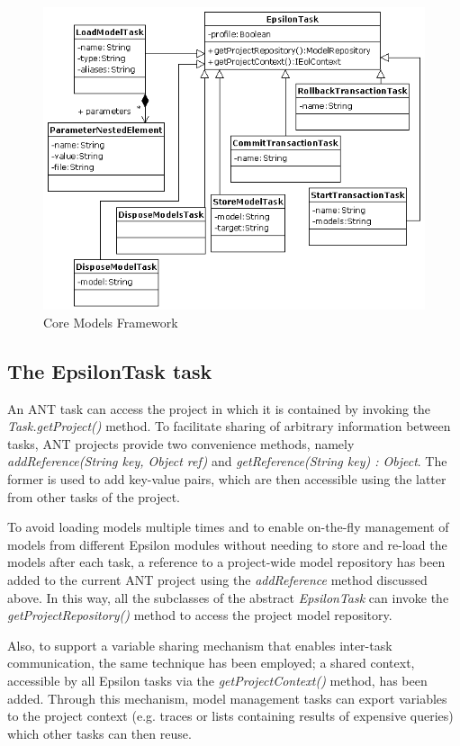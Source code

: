 \begin{figure}
	\centering
		\includegraphics{images/AntEpsilonModels.png}
	\caption{Core Models Framework}
	\label{fig:CoreModels}
\end{figure}

\subsection{The EpsilonTask task}
An ANT task can access the project in which it is contained by invoking the \emph{Task.getProject()} method. To facilitate sharing of arbitrary information between tasks, ANT projects provide two convenience methods, namely \emph{addReference(String key, Object ref)} and \emph{getReference(String key) : Object}. The former is used to add key-value pairs, which are then accessible using the latter from other tasks of the project.

To avoid loading models multiple times and to enable on-the-fly management of models from different Epsilon modules without needing to store and re-load the models after each task, a reference to a project-wide model repository has been added to the current ANT project using the \emph{addReference} method discussed above. In this way, all the subclasses of the abstract \emph{EpsilonTask} can invoke the \emph{getProjectRepository()} method to access the project model repository. 

Also, to support a variable sharing mechanism that enables inter-task communication, the same technique has been employed; a shared context, accessible by all Epsilon tasks via the \emph{getProjectContext()} method, has been added. Through this mechanism, model management tasks can export variables to the project context (e.g. traces or lists containing results of expensive queries) which other tasks can then reuse.

